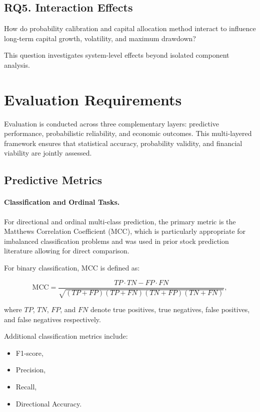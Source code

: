 \documentclass{l4proj}
\begin{document}
\subsection*{RQ5. Interaction Effects}

How do probability calibration and capital allocation method interact to influence long-term capital growth, volatility, and maximum drawdown?

This question investigates system-level effects beyond isolated component analysis.

\section{Evaluation Requirements}

Evaluation is conducted across three complementary layers: predictive performance, probabilistic reliability, and economic outcomes. This multi-layered framework ensures that statistical accuracy, probability validity, and financial viability are jointly assessed.

\subsection{Predictive Metrics}

\paragraph{Classification and Ordinal Tasks.}
For directional and ordinal multi-class prediction, the primary metric is the Matthews Correlation Coefficient (MCC), which is particularly appropriate for imbalanced classification problems and was used in prior stock prediction literature \citealp{xu-cohen-2018-stock} allowing for direct comparison. 

For binary classification, MCC is defined as:

\[
\mathrm{MCC} = 
\frac{TP \cdot TN - FP \cdot FN}
{\sqrt{(TP + FP)(TP + FN)(TN + FP)(TN + FN)}},
\]

where $TP$, $TN$, $FP$, and $FN$ denote true positives, true negatives, false positives, and false negatives respectively.

Additional classification metrics include:

\begin{itemize}
    \item F1-score,
    \item Precision,
    \item Recall,
    \item Directional Accuracy.
\end{itemize}
\end{document}
